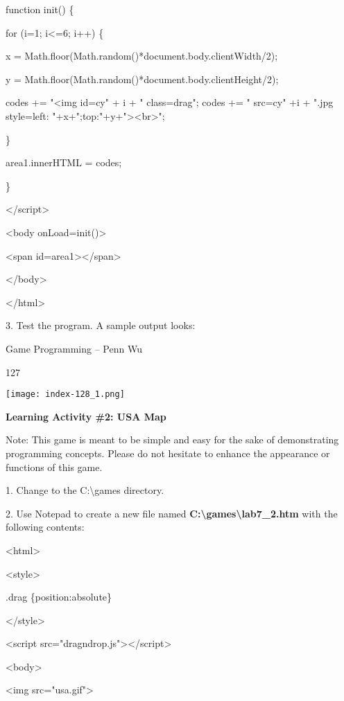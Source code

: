 \documentclass[
]{article}
\begin{document}
function init() \{

for (i=1; i\textless=6; i++) \{

x = Math.floor(Math.random()*document.body.clientWidth/2);

y = Math.floor(Math.random()*document.body.clientHeight/2);

codes += "\textless img id=\textquotesingle cy" + i +
"\textquotesingle{} class=\textquotesingle drag\textquotesingle"; codes
+= " src=cy" +i + ".jpg style=\textquotesingle left:
"+x+";top:"+y+"\textquotesingle\textgreater\textless br\textgreater";

\}

area1.innerHTML = codes;

\}

\textless/script\textgreater{}

\textless body onLoad=init()\textgreater{}

\textless span id=area1\textgreater\textless/span\textgreater{}

\textless/body\textgreater{}

\textless/html\textgreater{}

3. Test the program. A sample output looks:

Game Programming -- Penn Wu

127

\protect\hypertarget{index_split_008.htmlux5cux23p128}{}{}\texttt{[image: index-128\_1.png]}

\textbf{Learning Activity \#2: USA Map}

Note: This game is meant to be simple and easy for the sake of
demonstrating programming concepts. Please do not hesitate to enhance
the appearance or functions of this game.

1. Change to the C:\textbackslash games directory.

2. Use Notepad to create a new file named
\textbf{C:\textbackslash games\textbackslash lab7\_2.htm} with the
following contents:

\textless html\textgreater{}

\textless style\textgreater{}

.drag \{position:absolute\}

\textless/style\textgreater{}

\textless script
src="dragndrop.js"\textgreater\textless/script\textgreater{}

\textless body\textgreater{}

\textless img src="usa.gif"\textgreater{}
\end{document}
